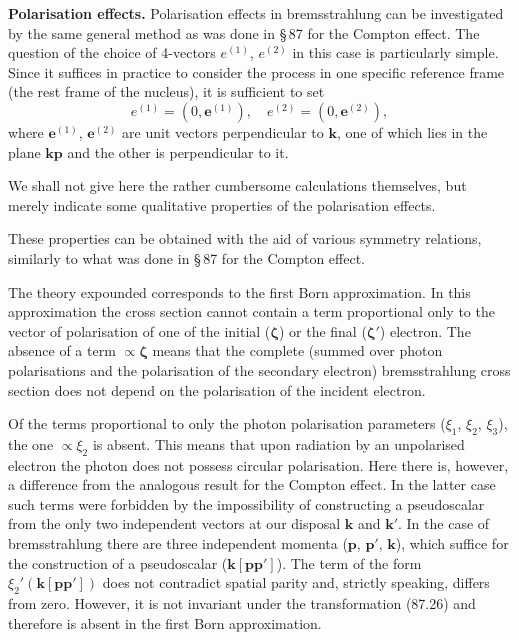 \textbf{Polarisation effects.} Polarisation effects in bremsstrahlung can be investigated by the same general method as was done in \S\,87 for the Compton effect. The question of the choice of 4-vectors $e^{(1)}$, $e^{(2)}$ in this case is particularly simple. Since it suffices in practice to consider the process in one specific reference frame (the rest frame of the nucleus), it is sufficient to set
\[
e^{(1)} = (0, \mathbf{e}^{(1)}), \quad e^{(2)} = (0, \mathbf{e}^{(2)}),
\]
where $\mathbf{e}^{(1)}$, $\mathbf{e}^{(2)}$ are unit vectors perpendicular to $\mathbf{k}$, one of which lies in the plane $\mathbf{kp}$ and the other is perpendicular to it.

We shall not give here the rather cumbersome calculations themselves, but merely indicate some qualitative properties of the polarisation effects.


These properties can be obtained with the aid of various symmetry relations, similarly to what was done in \S\,87 for the Compton effect.

The theory expounded corresponds to the first Born approximation. In this approximation the cross section cannot contain a term proportional only to the vector of polarisation of one of the initial ($\boldsymbol{\zeta}$) or the final ($\boldsymbol{\zeta}'$) electron. The absence of a term $\propto \boldsymbol{\zeta}$ means that the complete (summed over photon polarisations and the polarisation of the secondary electron) bremsstrahlung cross section does not depend on the polarisation of the incident electron.

Of the terms proportional to only the photon polarisation parameters ($\xi_1$, $\xi_2$, $\xi_3$), the one $\propto \xi_2$ is absent. This means that upon radiation by an unpolarised electron the photon does not possess circular polarisation. Here there is, however, a difference from the analogous result for the Compton effect. In the latter case such terms were forbidden by the impossibility of constructing a pseudoscalar from the only two independent vectors at our disposal $\mathbf{k}$ and $\mathbf{k}'$. In the case of bremsstrahlung there are three independent momenta ($\mathbf{p}$, $\mathbf{p}'$, $\mathbf{k}$), which suffice for the construction of a pseudoscalar ($\mathbf{k}[\mathbf{pp}']$). The term of the form $\xi_2'(\mathbf{k}[\mathbf{pp}'])$ does not contradict spatial parity and, strictly speaking, differs from zero. However, it is not invariant under the transformation (87.26) and therefore is absent in the first Born approximation.

